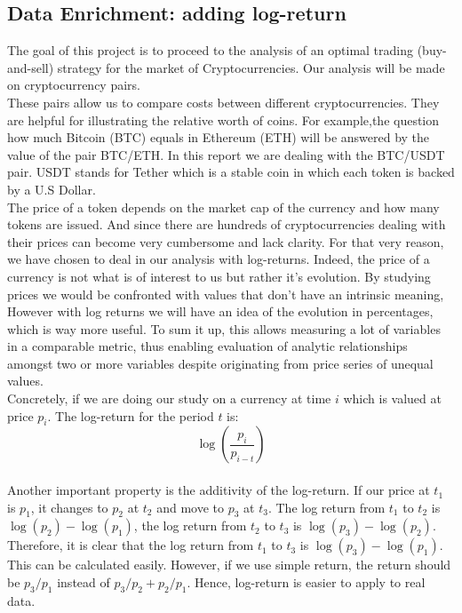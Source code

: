 \documentclass[twoside]{report}
\begin{document}
\begin{spacing}{1}
\begin{itemize}
\end{itemize}



\subsection{Data Enrichment: adding log-return}

The goal of this project is to proceed to the analysis of an optimal trading (buy-and-sell) strategy for the market of Cryptocurrencies. Our analysis will be made on cryptocurrency pairs.\\
These pairs allow us to compare costs between different cryptocurrencies. They are helpful for illustrating the relative worth of coins. For example,the question how much Bitcoin (BTC) equals in Ethereum (ETH) will be answered by the value of the pair BTC/ETH.
In this report we are dealing with the BTC/USDT pair. USDT stands for Tether which is a stable coin in which each token is backed by a U.S Dollar.\\
The price of a token depends on the market cap of the currency and how many tokens are issued. And since there are hundreds of cryptocurrencies dealing with their prices can become very cumbersome and lack clarity. For that very reason, we have chosen to deal in our analysis with log-returns.
Indeed, the price of a currency is not what is of interest to us but rather it's evolution. By studying prices we would be confronted with values that don't have an intrinsic meaning, However with log returns we will have an idea of the evolution in percentages, which is way more useful. To sum it up, this allows measuring a lot of variables in a comparable metric, thus enabling evaluation of analytic relationships amongst two or more variables despite originating from price series of unequal values. \\
Concretely, if we are doing our study on a currency at time $i$ which is valued at price $p_i$. The log-return for the period $t$ is:
$$\log\left(\frac{p_i}{p_{i-t}}\right)$$\\

Another important property is the additivity of the log-return. If our price at $t_1$ is $p_1$, it changes to $p_2$ at $t_2$ and move to $p_3$ at $t_3$. The log return from $t_1 $ to $t_2$ is $\log (p_2) - \log (p_1)$, the log return from $t_2 $ to $t_3$ is $\log (p_3) - \log (p_2)$. Therefore, it is clear that the log return from $t_1 $ to $t_3$ is $\log (p_3) - \log (p_1)$. This can be calculated easily. However, if we use simple return, the return should be $p_3/p_1$ instead of $p_3/p_2 + p_2/p_1$. Hence, log-return is easier to apply to real data.


\end{spacing}
\end{document}
